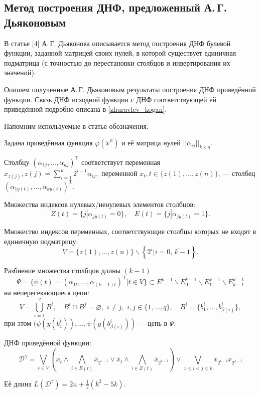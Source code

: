 \documentclass[12pt,a4paper,oneside,fleqn,leqno]{article}
\theoremstyle{definition}
\begin{document}
		\subsection{Метод построения ДНФ, предложенный А.\,Г. Дьяконовым} \label{dj}
			В статье [4] А.\,Г. Дьяконова описывается метод построения ДНФ булевой функции, заданной матрицей своих нулей, в которой существует единичная подматрица (с точностью до перестановки столбцов и инвертирования их значений).\par
			Опишем полученные А.\,Г. Дьяконовым результаты построения ДНФ приведённой функции. Связь ДНФ исходной функции с ДНФ соответствующей ей приведённой подробно описана в \ref{zhuravlev_kogan}.\par
			Напомним используемые в статье обозначения.\par
			Задана приведённая функция $\varphi(\tilde x^n)$ и её матрица нулей $||\alpha_{ij}||_{k \times n}.$\par
			Столбцу $(\alpha_{1j}, \ldots, \alpha_{kj})^{\text{T}}$ соответствует переменная $x_{z(j)}, z(j) = \sum\limits_{i = 1}^k 2^{i - 1}\alpha_{ij},$ переменной $x_t, t\in \{z(1),\ldots,z(n)\}$, --- столбец $(\alpha_{1y(t)}, \ldots, \alpha_{ky(t)})^{\text{T}}.$\par
			Множества индексов нулевых/ненулевых элементов столбцов:
			$$
				Z(t) = \{j | \alpha_{jy(t)} = 0\},\quad E(t) = \{j | \alpha_{jy(t)} = 1\}.
			$$\par
			Множество индексов переменных, соответствующие столбцы которых не входят в единичную подматрицу:
			$$
				V = \{z(1), \ldots, z(n)\} \backslash \left\{2^i | i = \overline{0,\,k - 1}\right\}.
			$$\par
			Разбиение множества столбцов длины $(k - 1)$
			$$
				\Psi = \{\psi(t) = (\alpha_{1t}, \ldots, \alpha_{(k - 1) t})^{\text{T}} | t \in V\} \subset E^{k - 1}\backslash E^{k - 1}_0\backslash E^{k - 1}_1 \backslash E^{k - 1}_{k - 1}
			$$
			 на непересекающиеся цепи:
			$$
				V = \bigcup_{i = 1}^qB^i,\quad B^i\cap B^j = \varnothing,\,\,i \neq j,\,\,i,j \in \{1,\ldots,q\},\quad B^i = \{b^i_1,\ldots, b^i_{\beta(i)} \},
			$$
			при этом $(\psi(y(b^i_1)), \ldots, \psi(y(b^i_{\beta(i)}))$ --- цепь в $\Psi.$\par
			ДНФ приведённой функции:
			$$
				\mathcal{D}^{\gamma} = \bigvee_{t  \in V} \left(x_t \wedge \bigwedge_{i \in E(t)} \bar{x}_{2^{i - 1}} \vee \bar{x}_t \wedge \bigwedge_{i \in Z(t)} \bar{x}_{2^{i - 1}}\right) \vee \bigvee_{1 \leqslant i < j \leqslant k} x_{2^{i - 1}} x_{2^{j - 1}}
			$$\par
			Её длина $L(\mathcal{D}^{\gamma}) = 2n + \frac{1}{2}(k^2 - 5k).$\par
			
\end{document}
